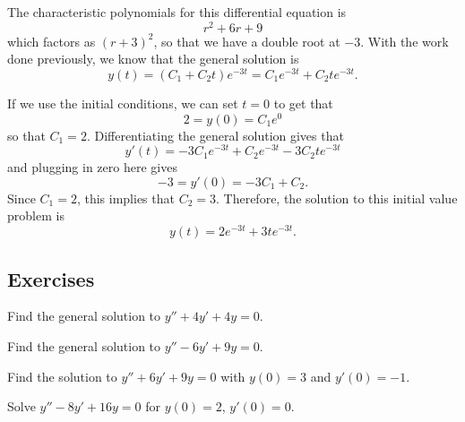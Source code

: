 \begin{exampleSol}
The characteristic polynomials for this differential equation is 
\begin{equation*}
r^2 + 6r + 9
\end{equation*}
which factors as $(r+3)^2$, so that we have a double root at $-3$. With the work done previously, we know that the general solution is
\begin{equation*}
y(t) = (C_1 + C_2t)e^{-3t} = C_1e^{-3t} + C_2te^{-3t}.
\end{equation*} 

If we use the initial conditions, we can set $t=0$ to get that
\begin{equation*}
2 = y(0) = C_1 e^0
\end{equation*}
so that $C_1 = 2$. Differentiating the general solution gives that
\begin{equation*}
y'(t) = -3C_1e^{-3t} + C_2e^{-3t} -3C_2te^{-3t}
\end{equation*}
and plugging in zero here gives
\begin{equation*}
-3 = y'(0) = -3C_1 + C_2.
\end{equation*}
Since $C_1 = 2$, this implies that $C_2 = 3$. Therefore, the solution to this initial value problem is
\begin{equation*}
y(t) = 2e^{-3t} + 3te^{-3t}.
\end{equation*}
\end{exampleSol}

\subsection{Exercises}

\begin{exercise}
Find the general solution to $y'' + 4y' + 4y = 0$.
\end{exercise}

\begin{exercise}\ansMark%
Find the general solution to
$y''-6y'+9y=0$.
\end{exercise}


\begin{exercise}
Find the solution to $y'' + 6y' + 9y = 0$ with $y(0) = 3$ and $y'(0) = -1$. 
\end{exercise}

\begin{exercise}
Solve $y'' - 8y' + 16 y = 0$ for $y(0) = 2$, $y'(0) = 0$.
\end{exercise}

